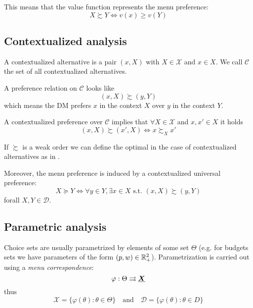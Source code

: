 \documentclass[12pt]{extarticle}
\renewcommand{\vec}[1]{\uvec{#1}}
\begin{document}
This means that the value function represents the menu preference:
\begin{equation}
    X \succsim Y \iff v(x) \geq v(Y)
\end{equation}

\subsection{Contextualized analysis}

A contextualized alternative is a pair $(x, X)$ with $X \in \mathcal X$ and $x \in X$.
We call $\mathcal C$ the set of all contextualized alternatives.

A preference relation on $\mathcal C$ looks like
\begin{equation}
    (x, X) \succsim (y, Y)
\end{equation}
which means the DM prefers $x$ in the context $X$ over $y$ in the context $Y$.

A contextualized preference over $\mathcal C$ implies that $\forall X \in \mathcal X$ and $x, x' \in X$ it holds
\begin{equation}
    (x, X) \succsim (x', X) \iff x \succsim_X x'
\end{equation}

If $\succsim$ is a weak order we can define the optimal in the case of contextualized alternatives as in .

Moreover, the menu preference is induced by a contextualized universal preference:
\begin{equation}
    X \succeq Y \iff \forall y \in Y, \exists x \in X \text{ s.t. } (x, X) \succsim (y, Y)
\end{equation}
forall $X, Y \in \mathcal D$.

\subsection{Parametric analysis}

Choice sets are usually parametrized by elements of some set $\Theta$ (e.g. for budgets sets we have parameters of the form $(p, w) \in \mathbb{R}^2_+$).
Parametrization is carried out using a \emph{menu correspondence}:
\begin{equation}
    \varphi: \Theta \rightrightarrows \vec X
\end{equation}
thus
\begin{equation}
    \mathcal X = \{ \varphi(\theta) : \theta \in \Theta \} \quad \text{and} \quad \mathcal D = \{ \varphi(\theta) : \theta \in D \}
\end{equation}
\end{document}
